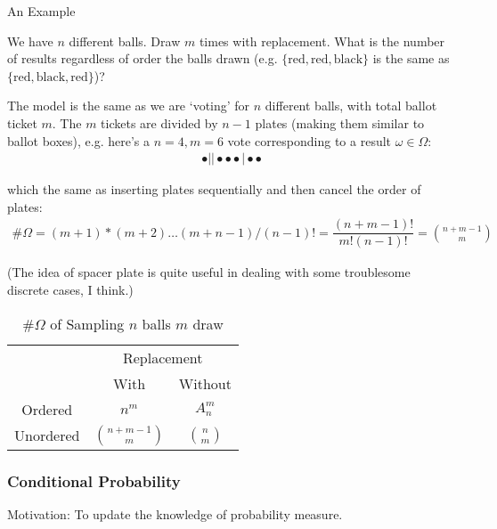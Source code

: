 \begin{point}
    An Example 
\end{point}

    We have $ n $ different balls. Draw $ m $ times with replacement. What is the number of results regardless of order the balls drawn (e.g. $ \{\mathrm{red,red,black} \} $ is the same as $ \{\mathrm{red,black,red} \} $)? 

    The model is the same as we are `voting' for $ n $ different balls, with total ballot ticket $ m $. The $ m $ tickets are divided by $ n-1 $ plates (making them similar to ballot boxes), e.g. here's a $ n=4,m=6 $ vote corresponding to a result $ \omega \in\Omega  $:
    \begin{align}
         \bullet  \big|  \big| \bullet \bullet \bullet \big|  \bullet \bullet 
    \end{align}

    which the same as inserting plates sequentially and then cancel the order of plates:
    \begin{align}
        \# \Omega  = (m+1)*(m+2)\ldots (m+n-1)\bigg/ (n-1)! = \dfrac{(n+m-1)!}{m!(n-1)!}=\binom{n+m-1}{m}
    \end{align}

    (The idea of spacer plate is quite useful in dealing with some troublesome discrete cases, I think.)
    
    \begin{table}[H]
        \centering
        \renewcommand\arraystretch{1}
        \caption{$ \# \Omega  $ of Sampling $ n $ balls $ m $ draw}
        \begin{tabular}{ccc}
            \hline
            \hline
            &\multicolumn{2}{c}{Replacement}\\
            \cline{2-3}
            &With&Without\\
            \hline
            Ordered&$ n^m $&$ A_{n}^m $\\
            Unordered&$ \binom{n+m-1}{m} $&$ \binom{n}{m} $\\
            \hline
            \hline
        \end{tabular}
        \label{}
    \end{table}


    
    
    


\subsubsection{Conditional Probability}
    Motivation: To update the knowledge of probability measure.

